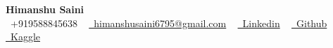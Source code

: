 \begin{center}
    \textbf{\Huge Himanshu Saini } \\ \vspace{10pt}
    \small \faPhone\ +919588845638  ~ 
    \href{mailto:himanshusaini6795@gmail.com}{\faEnvelope\ himanshusaini6795@gmail.com} ~ 
    \href{https://www.linkedin.com/in/himanshu-saini-7886b414b/}{\faLinkedin\ Linkedin}  ~
    \href{https://github.com/himanshusaini4713}{\faGithub\ Github} ~
    \href{https://www.kaggle.com/hsaini}{\faKaggle\ Kaggle}  ~
    \vspace{8pt}
\end{center}